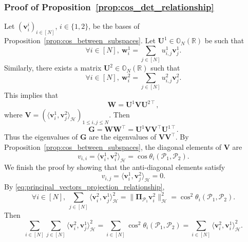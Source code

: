 \documentclass[twoside,11pt]{book}
\numberwithin{theorem}{chapter}
\numberwithin{definition}{chapter}
\numberwithin{proposition}{chapter}
\numberwithin{corollary}{chapter}
\numberwithin{example}{chapter}
\numberwithin{lemma}{chapter}
\numberwithin{assumption}{chapter}
\DeclareMathOperator{\Tran}{\intercal}
\begin{document}
\subsubsection{Proof of Proposition~\ref{prop:cos_det_relationship}}
Let $(\bm{v}^{i}_{i})_{i \in [N]}$, $i\in\{1,2\}$, be the bases of Proposition~\ref{prop:cos_between_subspaces}. Let $\bm{U}^{1} \in \mathbb{O}_{N}(\mathbb{R})$ be such that
\begin{equation}
\forall i \in [N], \: \bm{w}^{1}_{i} = \sum\limits_{j \in [N]} u^{1}_{i,j} \bm{v}^{1}_{j}.
\end{equation}
Similarly, there exists a matrix $\bm{U}^{2} \in \mathbb{O}_{N}(\mathbb{R})$ such that
\begin{equation}
\forall i \in [N], \: \bm{w}^{2}_{i} = \sum\limits_{j \in [N]} u^{2}_{i,j} \bm{v}^{2}_{j}.
\end{equation}
This implies that
\begin{equation}
\bm{W} = \bm{U}^{1}\bm{V}\bm{U}^{2 \Tran},
\end{equation}
where $\displaystyle \bm{V} = (\langle \bm{v}^{1}_{i}, \bm{v}^{2}_{j} \rangle_{\mathcal{H}})_{1 \leq i,j \leq N}$. Then
\begin{equation}
\bm{G} = \bm{W}\bm{W}^{\Tran} = \bm{U}^{1}\bm{V}\bm{V}^{\Tran}\bm{U}^{1 \Tran}.
\end{equation}
Thus the eigenvalues of $\bm{G}$ are the eigenvalues of $\bm{V}\bm{V}^{\Tran}$. By Proposition~\ref{prop:cos_between_subspaces}, the diagonal elements of $\bm{V}$ are
\begin{equation}\label{eq:diagonal_of_V}
v_{i,i} = \langle \bm{v}^{1}_{i}, \bm{v}^{2}_{i} \rangle_{\mathcal{H}} = \cos \theta_{i}(\mathcal{P}_{1},\mathcal{P}_{2}).
\end{equation}
We finish the proof by showing that the anti-diagonal elements satisfy
\begin{equation}\label{eq:anti_diagonal_of_V}
v_{i,j} = \langle \bm{v}^{1}_{i}, \bm{v}^{2}_{j} \rangle_{\mathcal{H}} = 0.
\end{equation}
By \eqref{eq:principal_vectors_projection_relationship},
\begin{equation}
\forall i \in [N], \:\sum\limits_{j \in [N]} \langle \bm{v}_{i}^{2}, \bm{v}_{j}^{1}\rangle_{\mathcal{H}}^{2} = \|\bm{\Pi}_{\mathcal{P}_{1}}\bm{v}_{i}^{2}\|_{\mathcal{H}}^{2} = \cos^{2} \theta_{i}(\mathcal{P}_{1},\mathcal{P}_{2}).
\end{equation}
Then
\begin{equation}
 \sum\limits_{i \in [N]}\sum\limits_{j \in [N]} \langle \bm{v}_{i}^{2}, \bm{v}_{j}^{1}\rangle_{\mathcal{H}}^{2} = \sum\limits_{i \in [N]} \cos^{2} \theta_{i}(\mathcal{P}_{1},\mathcal{P}_{2}) = \sum\limits_{i \in [N]} \langle \bm{v}_{i}^{2}, \bm{v}_{i}^{1}\rangle_{\mathcal{H}}^{2} .
\end{equation}
\end{document}
